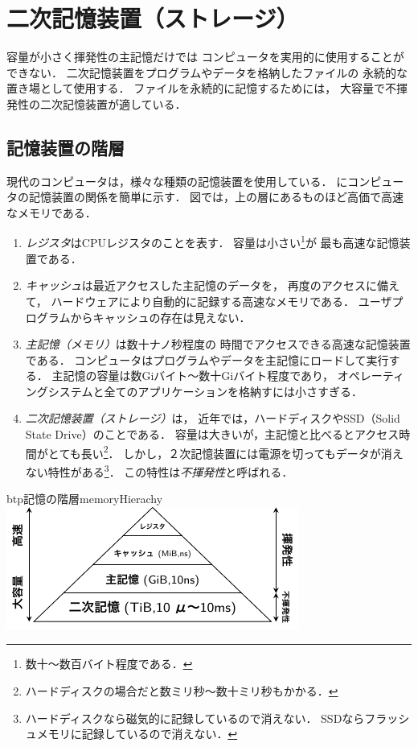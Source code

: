 \chapter{二次記憶装置（ストレージ）}
容量が小さく揮発性の主記憶だけでは
コンピュータを実用的に使用することができない．
二次記憶装置をプログラムやデータを格納したファイルの
永続的な置き場として使用する．
ファイルを永続的に記憶するためには，
大容量で不揮発性の二次記憶装置が適している．

\section{記憶装置の階層}
現代のコンピュータは，様々な種類の記憶装置を使用している．
にコンピュータの記憶装置の関係を簡単に示す．
図では，上の層にあるものほど高価で高速なメモリである．

\begin{enumerate}
\item \emph{レジスタ}はCPUレジスタのことを表す．
  容量は小さい\footnote{数十〜数百バイト程度である．}が
  最も高速な記憶装置である．
\item \emph{キャッシュ}は最近アクセスした主記憶のデータを，
  再度のアクセスに備えて，
  ハードウェアにより自動的に記録する高速なメモリである．
  ユーザプログラムからキャッシュの存在は見えない．
\item \emph{主記憶（メモリ）}は数十ナノ秒程度の
  時間でアクセスできる高速な記憶装置である．
  コンピュータはプログラムやデータを主記憶にロードして実行する．
  主記憶の容量は数Giバイト〜数十Giバイト程度であり，
  オペレーティングシステムと全てのアプリケーションを格納すには小さすぎる．
\item \emph{二次記憶装置（ストレージ）}は，
  近年では，ハードディスクやSSD（Solid State Drive）のことである．
  容量は大きいが，主記憶と比べるとアクセス時間がとても長い\footnote{
    ハードディスクの場合だと数ミリ秒〜数十ミリ秒もかかる．}．
  しかし，２次記憶装置には電源を切ってもデータが消えない特性がある\footnote{
    ハードディスクなら磁気的に記録しているので消えない．
    SSDならフラッシュメモリに記録しているので消えない．}．
  この特性は\emph{不揮発性}と呼ばれる．
\end{enumerate}

\begin{myfig}{btp}{記憶の階層}{memoryHierachy}
  \includegraphics[scale=1.6]{Fig/memoryHierarchy.pdf}
\end{myfig}

